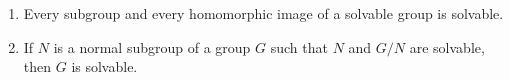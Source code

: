 \begin{enumerate}
\item[(i)] Every subgroup and every homomorphic image of a solvable group is solvable.
\item[(ii)] If $N$ is a normal subgroup of a group $G$ such that $N$ and $G/N$ are solvable, then $G$ is solvable.
\end{enumerate}
